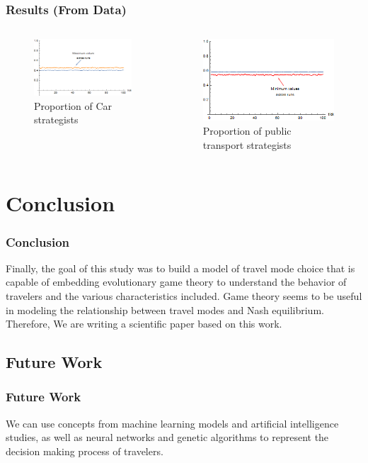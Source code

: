 \documentclass[aspectratio=169]{beamer}
\begin{document}
\begin{frame}
\frametitle{Results (From Data)}
\begin{columns}[c]
  \column{2in}  %
  \begin{figure}
  \includegraphics[width=5cm]{average cars avgmin}
  
  \caption{Proportion of Car strategists}
  \end{figure}
 
  \column{2in}
   \begin{figure}

	\includegraphics[width=5cm]{average prop avgmin}

\caption{Proportion of public transport strategists}
\end{figure}

 \end{columns}
\end{frame}

\section{Conclusion}
\begin{frame}


\frametitle{Conclusion}

Finally, the goal of this study was to build a model of travel mode choice that is capable of embedding evolutionary game theory to understand the behavior of travelers and the various characteristics included.
Game theory seems to be useful in modeling the relationship between travel modes and Nash equilibrium. Therefore, We are writing a scientific paper based on this work.
\end{frame}
\subsection{Future Work}
\begin{frame}
\frametitle{Future Work}
We can use concepts from machine learning models and artificial intelligence studies, as well as neural networks and genetic algorithms to represent the decision making process of travelers.
\end{frame}
\end{document}
